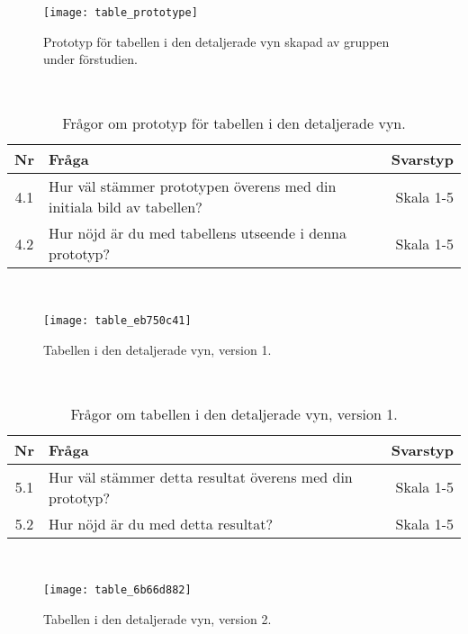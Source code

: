 \begin{figure}[H]
  \centering
  \texttt{[image: table\_prototype]}
  \caption{Prototyp för tabellen i den detaljerade vyn skapad av gruppen under förstudien.}
  \label{fig:table_0}
\end{figure}
\

\begin{table}[h!]
  \caption{Frågor om prototyp för tabellen i den detaljerade vyn.}
  \def\arraystretch{1.5}
  \begin{adjustbox}{max width=\textwidth}
    \begin{tabularx}{\textwidth}{ | c | X | r |}
      \hline
      \textbf{Nr} & \textbf{Fråga} & \textbf{Svarstyp} \\
      \hline
      4.1 & Hur väl stämmer prototypen överens med din initiala bild av tabellen? & Skala 1-5 \\
      \hline
      4.2 & Hur nöjd är du med tabellens utseende i denna prototyp? & Skala 1-5 \\
      \hline 
    \end{tabularx}
  \end{adjustbox}
  \label{tab:prototyp_enkat_table_0}
\end{table}
\ 

\begin{figure}[H]
  \centering
  \texttt{[image: table\_eb750c41]}
  \label{fig:table_1}
  \caption{Tabellen i den detaljerade vyn, version 1.}
\end{figure}
\ 

\begin{table}[h!]
  \caption{Frågor om tabellen i den detaljerade vyn, version 1.}
  \def\arraystretch{1.5}
  \begin{adjustbox}{max width=\textwidth}
    \begin{tabularx}{\textwidth}{ | c | X | r |}
      \hline
      \textbf{Nr} & \textbf{Fråga} & \textbf{Svarstyp} \\
      \hline
      5.1 & Hur väl stämmer detta resultat överens med din prototyp? & Skala 1-5 \\
      \hline
      5.2 & Hur nöjd är du med detta resultat? & Skala 1-5 \\
      \hline 
    \end{tabularx}
  \end{adjustbox}
  \label{tab:prototyp_enkat_table_1}
\end{table}
\ 

\begin{figure}[H]
  \centering
  \texttt{[image: table\_6b66d882]}
  \label{fig:table_2}
  \caption{Tabellen i den detaljerade vyn, version 2.}
\end{figure}
\ 


